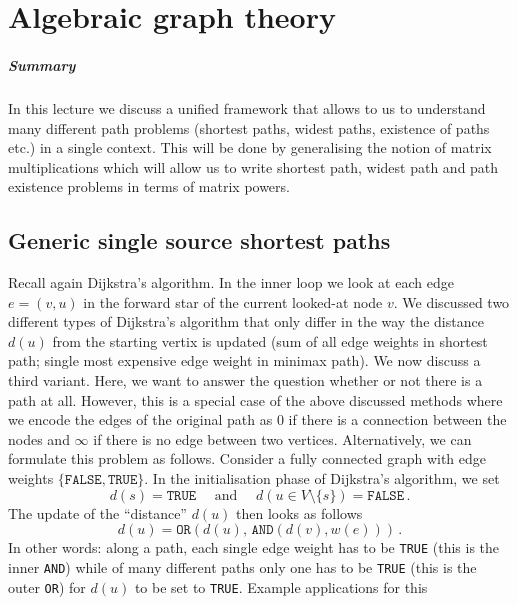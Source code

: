 \chapter{Algebraic graph theory}%
\label{chap:09}

\paragraph*{Summary} In this lecture we discuss a unified framework
that allows to us to understand many different path problems (shortest
paths, widest paths, existence of paths etc.) in a single
context. This will be done by generalising the notion of matrix
multiplications which will allow us to write shortest path, widest
path and path existence problems in terms of matrix powers.

\section{Generic single source shortest paths}
Recall again Dijkstra's algorithm. In the inner loop we look at each
edge $e = (v,u)$ in the forward star of the current looked-at node
$v$. We discussed two different types of Dijkstra's algorithm that
only differ in the way the distance $d(u)$ from the starting vertix is
updated (sum of all edge weights in shortest path; single most
expensive edge weight in minimax path). We now discuss a third
variant.  Here, we want to answer the question whether or not there is
a path at all. However, this is a special case of the above discussed
methods where we encode the edges of the original path as $0$ if there
is a connection between the nodes and $\infty$ if there is no edge
between two vertices. Alternatively, we can formulate this problem as
follows. Consider a fully connected graph with edge weights
$\{\mathtt{FALSE},\mathtt{TRUE}\}$. In the initialisation phase of
Dijkstra's algorithm, we set
\begin{equation*}
  d(s) = \mathtt{TRUE} \quad \text{ and } \quad d(u \in V \setminus \{s\}) = \mathtt{FALSE}\,.
\end{equation*}
The update of the ``distance'' $d(u)$ then looks as follows
\begin{equation*}
  d(u) = \mathtt{OR}(d(u),\, \mathtt{AND}(d(v), w(e)))\,.
\end{equation*}
In other words: along a path, each single edge weight has to be
\texttt{TRUE} (this is the inner \texttt{AND}) while of many different
paths only one has to be \texttt{TRUE} (this is the outer \texttt{OR})
for $d(u)$ to be set to \texttt{TRUE}. Example applications for this
